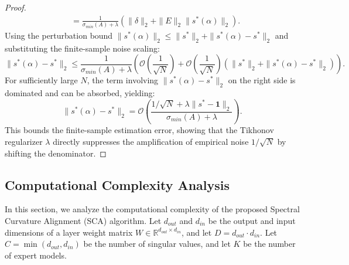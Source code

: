 \documentclass{article}
\theoremstyle{plain}
\theoremstyle{definition}
\theoremstyle{remark}
\begin{document}
\begin{proof}
\begin{align}
    &= \frac{1}{\sigma_{min}(A) + \lambda} \left( \|\delta\|_2 + \|E\|_2 \|s^*(\alpha)\|_2 \right).
\end{align}
Using the perturbation bound $\|s^*(\alpha)\|_2 \le \|s^*\|_2 + \|s^*(\alpha) - s^*\|_2$ and substituting the finite-sample noise scaling:
\begin{equation}
    \|s^*(\alpha) - s^*\|_2 \le \frac{1}{\sigma_{min}(A) + \lambda} \left( \mathcal{O}\left(\frac{1}{\sqrt{N}}\right) + \mathcal{O}\left(\frac{1}{\sqrt{N}}\right) \left(\|s^*\|_2 + \|s^*(\alpha) - s^*\|_2 \right) \right).
\end{equation}
For sufficiently large $N$, the term involving $\|s^*(\alpha) - s^*\|_2$ on the right side is dominated and can be absorbed, yielding:
\begin{equation}
    \|s^*(\alpha) - s^*\|_2 = \mathcal{O}\left( \frac{1 / \sqrt{N} + \lambda \|s^* - \mathbf{1}\|_2}{\sigma_{min}(A) + \lambda} \right).
\end{equation}
This bounds the finite-sample estimation error, showing that the Tikhonov regularizer $\lambda$ directly suppresses the amplification of empirical noise $1/\sqrt{N}$ by shifting the denominator.
\end{proof}

\subsection{Computational Complexity Analysis}

In this section, we analyze the computational complexity of the proposed Spectral Curvature Alignment (SCA) algorithm. 
Let $d_{out}$ and $d_{in}$ be the output and input dimensions of a layer weight matrix $W \in \mathbb{R}^{d_{out} \times d_{in}}$, and let $D = d_{out} \cdot d_{in}$. 
Let $C = \min(d_{out}, d_{in})$ be the number of singular values, and let $K$ be the number of expert models.
\end{document}
